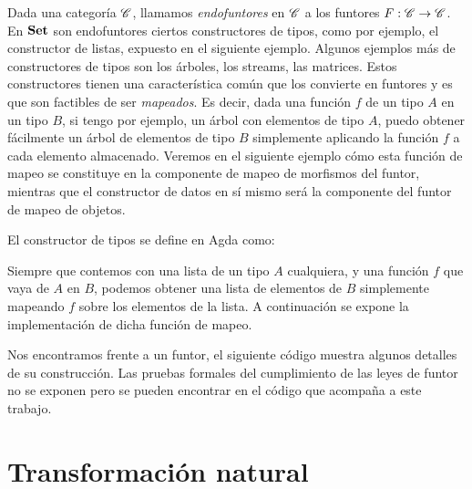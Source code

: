 Dada una categoría $\mathscr{C}$, llamamos {\it endofuntores} en $\mathscr{C}$ a los funtores $F : \mathscr{C} \to \mathscr{C}$.
En $\mathbf{Set}$ son endofuntores ciertos constructores de tipos, como por ejemplo, el constructor de listas, expuesto en el siguiente ejemplo.
Algunos ejemplos más de constructores de tipos son los árboles, los streams, las matrices.
Estos constructores tienen una característica común que los convierte en funtores y es que son factibles de ser {\it mapeados}. Es decir, dada una función $f$ de un tipo $A$ en un tipo $B$, si tengo por ejemplo, un árbol con elementos de tipo $A$, puedo obtener fácilmente un árbol de elementos de tipo $B$ simplemente aplicando la función $f$ a cada elemento almacenado. Veremos en el siguiente ejemplo cómo esta función de mapeo se constituye en la componente de mapeo de morfismos del funtor, mientras que el constructor de datos en sí mismo será la componente del funtor de mapeo de objetos.

\begin{example}El constructor de tipos  se define en Agda como:


Siempre que contemos con una lista de un tipo $A$ cualquiera, y una función $f$ que vaya de $A$ en $B$, podemos obtener una lista de elementos de $B$ simplemente mapeando $f$ sobre los elementos de la lista. A continuación se expone la implementación de dicha función de mapeo.


Nos encontramos frente a un funtor, el siguiente código muestra algunos detalles de su construcción. Las pruebas formales del cumplimiento de las leyes de funtor no se exponen pero se pueden encontrar en el código que acompaña a este trabajo.

\end{example}


\section{Transformación natural}

